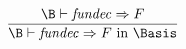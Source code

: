 \vspace{6pt}
\begin{equation}	%
\frac{\B\ts\fundec\ra\F}
     {\B\ts\fundec\ra\F\ \In\ \Basis
     }
\end{equation}




